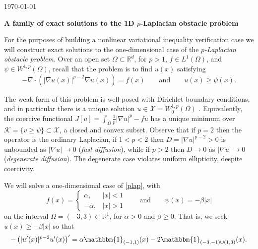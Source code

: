 \documentclass[11pt]{amsart}
\newcommand{\Div}{\ensuremath{\nabla\cdot}}
\newcommand{\grad}{\nabla}
\newcommand{\RR}{\mathbb{R}}
\begin{document}
\scriptsize \hfill \today

\Large
\bigskip
\centerline{\textbf{A family of exact solutions to the 1D $p$-Laplacian obstacle problem}}
\bigskip

\normalsize

\thispagestyle{empty}

For the purposes of building a nonlinear variational inequality verification case we will construct exact solutions to the one-dimensional case of the \emph{$p$-Laplacian obstacle problem}.  Over an open set $\Omega\subset \RR^d$, for $p>1$, $f \in L^1(\Omega)$, and $\psi \in W^{1,p}(\Omega)$, recall that the problem is to find $u(x)$ satisfying
\begin{equation}
-\Div\left(|\grad u(x)|^{p-2} \grad u(x)\right) = f(x) \qquad \text{and} \qquad u(x) \ge \psi(x). \label{plap}
\end{equation}

The weak form of this problem is well-posed with Dirichlet boundary conditions, and in particular there is a unique solution $u \in \mathcal{X} = W_0^{1,p}(\Omega)$ \cite{KinderlehrerStampacchia1980}.  Equivalently, the coercive functional $J[u] = \int_\Omega \frac{1}{p} |\grad u|^p - f u$ has a unique minimum over $\mathcal{K}=\{v \ge \psi\} \subset \mathcal{X}$, a closed and convex subset.  Observe that if $p=2$ then the operator is the ordinary Laplacian, if $1<p<2$ then $D=|\grad u|^{p-2}>0$ is unbounded as $|\grad u| \to 0$ (\emph{fast diffusion}), while if $p>2$ then $D\to 0$ as $|\grad u| \to 0$ (\emph{degenerate diffusion}).  The degenerate case violates uniform ellipticity, despite coercivity.

We will solve a one-dimensional case of \eqref{plap}, with
\begin{equation}
f(x) = \begin{cases} \alpha, & |x| < 1 \\ -\alpha, & |x| > 1\end{cases} \qquad \text{and} \qquad \psi(x) = - \beta |x| \label{data}
\end{equation}
on the interval $\Omega = (-3,3) \subset \RR^1$, for $\alpha > 0$ and $\beta \ge 0$.
That is, we seek $u(x) \ge -\beta |x|$ so that
\begin{equation}
-\left(|u'(x)|^{p-2} u'(x)\right)' = \alpha \mathbbm{1}_{(-1,1)}(x) - 2 \mathbbm{1}_{(-3,-1)\cup(1,3)}(x).  \label{concrete}
\end{equation}
\end{document}
